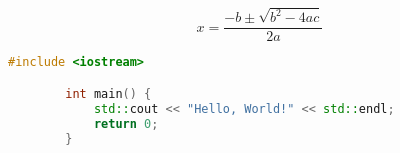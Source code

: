



\lipsum[10]

\begin{equation*}
    x = \frac{-b \pm \sqrt{b^2 - 4ac}}{2a}
\end{equation*}

%
%
%
%
%
%
%
%
%
%
%
%
%
%
%
%
%

\begin{lstlisting}[language=C++]
        #include <iostream>

        int main() {
            std::cout << "Hello, World!" << std::endl;
            return 0;
        }
\end{lstlisting}

